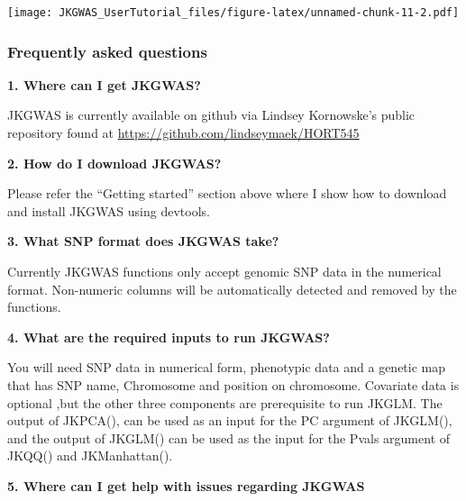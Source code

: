 \documentclass[
]{article}
\begin{document}
\texttt{[image: JKGWAS\_UserTutorial\_files/figure-latex/unnamed-chunk-11-2.pdf]}

\hypertarget{frequently-asked-questions}{%
\subsubsection{\texorpdfstring{\textbf{Frequently asked
questions}}{Frequently asked questions}}\label{frequently-asked-questions}}

\textbf{1. Where can I get JKGWAS?}

\par

JKGWAS is currently available on github via Lindsey Kornowske's public
repository found at \url{https://github.com/lindseymaek/HORT545}

\par

\textbf{2. How do I download JKGWAS?}

\par

Please refer the ``Getting started'' section above where I show how to
download and install JKGWAS using devtools.

\par

\textbf{3. What SNP format does JKGWAS take?}

\par

Currently JKGWAS functions only accept genomic SNP data in the numerical
format. Non-numeric columns will be automatically detected and removed
by the functions.

\par

\textbf{4. What are the required inputs to run JKGWAS?}

\par

You will need SNP data in numerical form, phenotypic data and a genetic
map that has SNP name, Chromosome and position on chromosome. Covariate
data is optional ,but the other three components are prerequisite to run
JKGLM. The output of JKPCA(), can be used as an input for the PC
argument of JKGLM(), and the output of JKGLM() can be used as the input
for the Pvals argument of JKQQ() and JKManhattan().

\textbf{5. Where can I get help with issues regarding JKGWAS}

\par
\end{document}
